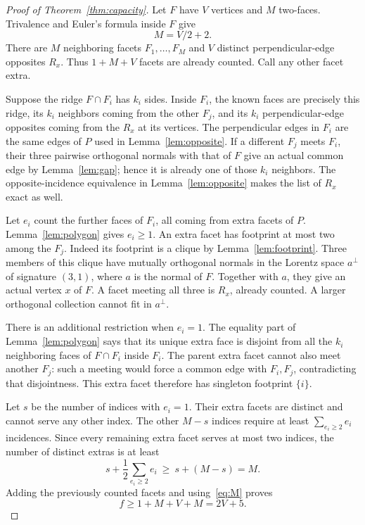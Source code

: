 \documentclass[11pt]{article}
\theoremstyle{remark}
\begin{document}
\begin{proof}[Proof of Theorem~\ref{thm:capacity}]
Let $F$ have $V$ vertices and $M$ two-faces. Trivalence and Euler's
formula inside $F$ give
\begin{equation}\label{eq:M}
 M=V/2+2.
\end{equation}
There are $M$ neighboring facets $F_1,\ldots,F_M$ and $V$ distinct
perpendicular-edge opposites $R_x$. Thus $1+M+V$ facets are already
counted. Call any other facet extra.

Suppose the ridge $F\cap F_i$ has $k_i$ sides. Inside $F_i$, the known
faces are precisely this ridge, its $k_i$ neighbors coming from the
other $F_j$, and its $k_i$ perpendicular-edge opposites coming from the
$R_x$ at its vertices. The perpendicular edges in $F_i$ are the same
edges of $P$ used in Lemma~\ref{lem:opposite}. If a different $F_j$
meets $F_i$, their three pairwise orthogonal normals with that of $F$
give an actual common edge by Lemma~\ref{lem:gap}; hence it is already
one of those $k_i$ neighbors. The opposite-incidence equivalence in
Lemma~\ref{lem:opposite} makes the list of $R_x$ exact as well.

Let $e_i$ count the further faces of $F_i$, all coming from extra
facets of $P$. Lemma~\ref{lem:polygon} gives $e_i\ge1$. An extra facet
has footprint at most two among the $F_j$. Indeed its footprint is a
clique by Lemma~\ref{lem:footprint}. Three members of this clique have
mutually orthogonal normals in the Lorentz space $a^\perp$ of signature
$(3,1)$, where $a$ is the normal of $F$. Together with $a$, they give
an actual vertex $x$ of $F$. A facet meeting all three is $R_x$, already
counted. A larger orthogonal collection cannot fit in $a^\perp$.

There is an additional restriction when $e_i=1$. The equality part of
Lemma~\ref{lem:polygon} says that its unique extra face is disjoint
from all the $k_i$ neighboring faces of $F\cap F_i$ inside $F_i$.
The parent extra facet cannot also meet another $F_j$: such a meeting
would force a common edge with $F_i,F_j$, contradicting that
disjointness. This extra facet therefore has singleton footprint
$\{i\}$.

Let $s$ be the number of indices with $e_i=1$. Their extra facets are
distinct and cannot serve any other index. The other $M-s$ indices
require at least $\sum_{e_i\ge2}e_i$ incidences. Since every remaining
extra facet serves at most two indices, the number of distinct extras
is at least
\[
 s+\frac12\sum_{e_i\ge2}e_i\ \ge\ s+(M-s)=M.
\]
Adding the previously counted facets and using~\eqref{eq:M} proves
\[
 f\ge1+M+V+M=2V+5.
\]
\end{proof}
\end{document}
